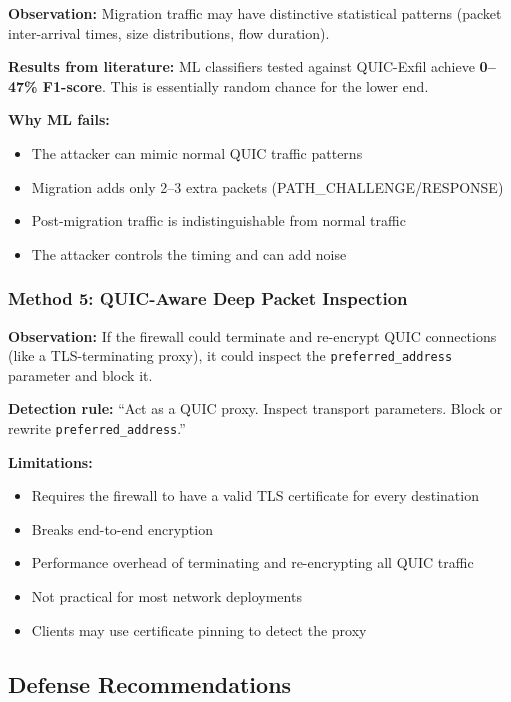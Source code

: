 \documentclass[11pt,a4paper]{article}
\begin{document}
\textbf{Observation:} Migration traffic may have distinctive statistical patterns (packet inter-arrival times, size distributions, flow duration).

\textbf{Results from literature:} ML classifiers tested against QUIC-Exfil achieve \textbf{0--47\% F1-score}. This is essentially random chance for the lower end.

\textbf{Why ML fails:}
\begin{itemize}
    \item The attacker can mimic normal QUIC traffic patterns
    \item Migration adds only 2--3 extra packets (PATH\_CHALLENGE/RESPONSE)
    \item Post-migration traffic is indistinguishable from normal traffic
    \item The attacker controls the timing and can add noise
\end{itemize}

\subsubsection{Method 5: QUIC-Aware Deep Packet Inspection}

\textbf{Observation:} If the firewall could terminate and re-encrypt QUIC connections (like a TLS-terminating proxy), it could inspect the \texttt{preferred\_address} parameter and block it.

\textbf{Detection rule:} ``Act as a QUIC proxy. Inspect transport parameters. Block or rewrite \texttt{preferred\_address}.''

\textbf{Limitations:}
\begin{itemize}
    \item Requires the firewall to have a valid TLS certificate for every destination
    \item Breaks end-to-end encryption
    \item Performance overhead of terminating and re-encrypting all QUIC traffic
    \item Not practical for most network deployments
    \item Clients may use certificate pinning to detect the proxy
\end{itemize}

\subsection{Defense Recommendations}
\end{document}
